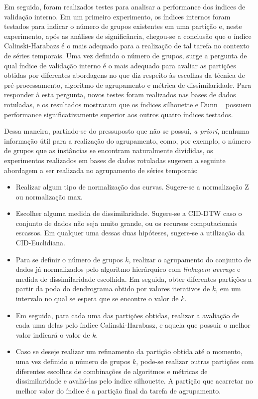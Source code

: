 Em seguida, foram realizados testes para analisar a performance dos índices de validação interno. Em um primeiro experimento, os índices internos foram testados para indicar o número de grupos  existentes em uma partição e, neste experimento, após as análises de significância, chegou-se a conclusão que o índice Calinski-Harabazs \parencite{CH} é o mais adequado para a realização de tal tarefa no contexto de séries temporais. Uma vez definido o número de grupos, surge a pergunta de qual índice de validação interno é o mais adequado para avaliar as partições obtidas por diferentes abordagens no que diz respeito às escolhas da técnica de pré-processamento, algoritmo de agrupamento e métrica de dissimilaridade. Para responder à esta pergunta, novos testes foram realizados nas bases de dados rotuladas, e os resultados mostraram que os índices silhouette \parencite{silhouette} e Dunn ~\parencite{Dunn} possuem performance significativamente superior aos outros quatro índices testados.

Dessa maneira, partindo-se do pressuposto que não se possui, \emph{a priori}, nenhuma informação útil para a realização do agrupamento, como, por exemplo, o número de grupos que as instâncias se encontram naturalmente divididas, os experimentos realizados em bases de dados rotuladas sugerem a seguinte abordagem a ser realizada no agrupamento de séries temporais:

\begin{itemize}
	\item Realizar algum tipo de normalização das curvas. Sugere-se a normalização Z ou normalização max.
	\item Escolher alguma medida de dissimilaridade. Sugere-se a CID-DTW caso o conjunto de dados não seja muito grande, ou os recursos computacionais escassos. Em qualquer uma dessas duas hipóteses, sugere-se a utilização da CID-Euclidiana.
	\item Para se definir o número de grupos $k$, realizar o agrupamento do conjunto de dados já normalizados pelo algoritmo hierárquico com \emph{linkagem average} e medida de dissimilaridade escolhida. Em seguida, obter diferentes partições a partir da poda do dendrograma obtido por valores iterativos de $k$, em um intervalo no qual se espera que se encontre o valor de $k$.
	\item Em seguida, para cada uma das partições obtidas, realizar a avaliação de cada uma delas pelo índice Calinski-Harabasz, e aquela que possuir o melhor valor indicará o valor de $k$.
	\item Caso se deseje realizar um refinamento da partição obtida até o momento, uma vez definido o número de grupos $k$, pode-se realizar outras partições com diferentes escolhas de combinações de algoritmos e métricas de dissimilaridade e avaliá-las pelo índice silhouette. A partição que acarretar no melhor valor do índice é a partição final da tarefa de agrupamento.
\end{itemize}

